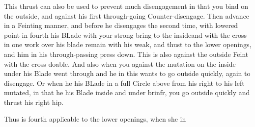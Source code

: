 This thrust can also be used to prevent much disengagement in that you bind on the outside, and against his first through-going Counter-disengage. Then advance in a Feinting manner, and before he disengages the second time, with lowered point in fourth his BLade with your strong bring to the insideand with the cross in one work over his blade remain with his weak, and thust to the lower openings, and him in his through-passing press down. This is also against the outside Feint with the cross doable. And also when you against the mutation on the inside under his Blade went through and he in this wants to go outside quickly, again to disengage. Or when he his BLade in a full Circle above from his right to his left mutated, in that he his Blade inside and under brinfr, you go outside quickly and thrust his right hip.


Thus is fourth applicable to the lower openings, when she in
